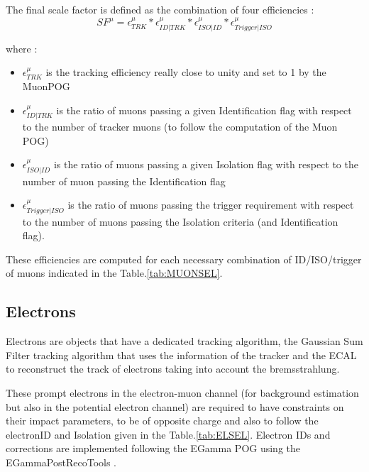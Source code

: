 \documentclass{cernatlasnote}
\begin{document}
The final scale factor is defined as the combination of four efficiencies :
\begin{equation}
    SF^{\mu} = \epsilon^{\mu}_{TRK} *\epsilon^{\mu}_{ID|TRK} * \epsilon^{\mu}_{ISO|ID} * \epsilon^{\mu}_{Trigger|ISO}
\end{equation}

where :
\begin{itemize}
    \item $\epsilon^{\mu}_{TRK}$ is the tracking efficiency really close to unity and set to 1 by the MuonPOG
    \item $\epsilon^{\mu}_{ID|TRK}$ is the ratio of muons passing a given Identification flag with respect to the number of tracker muons (to follow the computation of the Muon POG)
    \item $\epsilon^{\mu}_{ISO|ID}$ is the ratio of muons passing a given Isolation flag with respect to the number of muon passing the Identification flag
    \item $\epsilon^{\mu}_{Trigger|ISO}$ is the ratio of muons passing the trigger requirement with respect to the number of muons passing the Isolation criteria (and Identification flag).
\end{itemize}
These efficiencies are computed for each necessary combination \cite{MuonSpark3} of ID/ISO/trigger of muons  indicated in the Table.\ref{tab:MUONSEL}.



    \subsection{Electrons}

    Electrons are objects that have a dedicated tracking algorithm, the Gaussian Sum Filter tracking \cite{Adam_2005} algorithm that uses the information of the tracker and the ECAL to reconstruct the track of electrons taking into account the bremsstrahlung.

    These prompt electrons in the electron-muon channel (for background estimation but also in the potential electron channel) are required to have constraints on their impact parameters, to be of opposite charge and also to follow the electronID and Isolation given in the Table.\ref{tab:ELSEL}. Electron IDs and corrections are implemented following the EGamma POG using the EGammaPostRecoTools \cite{EgammaPostRecoTools}.
\end{document}
